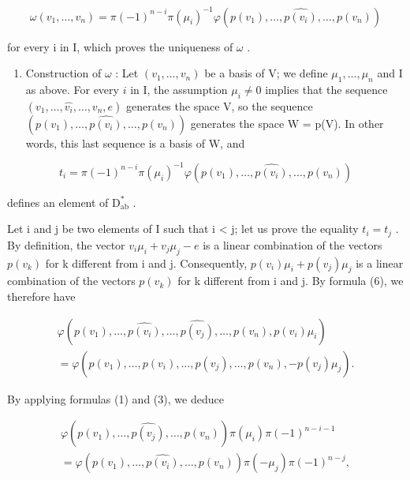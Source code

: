 \[
\omega (v _ {1}, \dots , v _ {n}) = \pi (- 1) ^ {n - i} \pi (\mu_ {i}) ^ {- 1} \varphi (p (v _ {1}), \dots , \widehat {p (v _ {i})}, \dots , p (v _ {n}))\tag{9}
\]

for every i in I, which proves the uniqueness of \(\omega\) .

\begin{enumerate}
\def\labelenumi{\Alph{enumi})}
\setcounter{enumi}{1}
\tightlist
\item
  Construction of \(\omega\) : Let \((v_{1},\ldots,v_{n})\) be a basis of V; we define \(\mu_{1},\ldots,\mu_{n}\) and I as above. For every \(i\) in I, the assumption \(\mu_{i}\neq0\) implies that the sequence \((v_{1},\ldots,\widehat{v_{i}},\ldots,v_{n},e)\) generates the space V, so the sequence \((p(v_{1}),\ldots,\widehat{p(v_{i})},\ldots,p(v_{n}))\) generates the space W = p(V). In other words, this last sequence is a basis of W, and
\end{enumerate}

\[
t _ {i} = \pi (- 1) ^ {n - i} \pi (\mu_ {i}) ^ {- 1} \varphi (p (v _ {1}), \ldots , \widehat {p (v _ {i})}, \ldots , p (v _ {n}))\tag{10}
\]

defines an element of \(\mathrm{D}_{\mathrm{ab}}^{*}\) .

Let i and j be two elements of I such that i \textless{} j; let us prove the equality \(t_{i} = t_{j}\) . By definition, the vector \(v_{i}\mu_{i} + v_{j}\mu_{j} - e\) is a linear combination of the vectors \(p(v_{k})\) for k different from i and j. Consequently, \(p(v_{i})\mu_{i} + p(v_{j})\mu_{j}\) is a linear combination of the vectors \(p(v_{k})\) for k different from i and j. By formula (6), we therefore have

\[
\begin{array}{c} \varphi (p (v _ {1}), \ldots , \widehat {p (v _ {i})}, \ldots , \widehat {p (v _ {j})}, \ldots , p (v _ {n}), p (v _ {i}) \mu_ {i}) \\ = \varphi (p (v _ {1}), \ldots , \widehat {p (v _ {i})}, \ldots , \widehat {p (v _ {j})}, \ldots , p (v _ {n}), - p (v _ {j}) \mu_ {j}). \end{array}
\]

By applying formulas (1) and (3), we deduce

\[
\begin{array}{c} \varphi (p (v _ {1}), \ldots , \widehat {p (v _ {j})}, \ldots , p (v _ {n})) \pi (\mu_ {i}) \pi (- 1) ^ {n - i - 1} \\ = \varphi (p (v _ {1}), \ldots , \widehat {p (v _ {i})}, \ldots , p (v _ {n})) \pi (- \mu_ {j}) \pi (- 1) ^ {n - j}, \end{array}
\]


